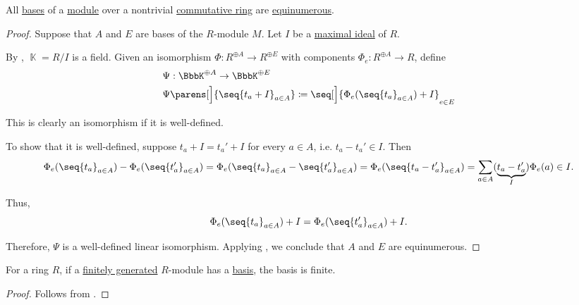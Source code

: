 \begin{proposition}\label{thm:commutative_module_rank}
  All \hyperref[def:hamel_basis]{bases} of a \hyperref[def:module]{module} over a nontrivial \hyperref[def:ring/commutative]{commutative ring} are \hyperref[def:equinumerosity]{equinumerous}.
\end{proposition}
\begin{proof}
  Suppose that \( A \) and \( E \) are bases of the \( R \)-module \( M \). Let \( I \) be a \hyperref[def:semiring_ideal/maximal]{maximal ideal} of \( R \).

  By , \( \BbbK = R / I \) is a field. Given an isomorphism \( \Phi: R^{\oplus A} \to R^{\oplus E} \) with components \( \Phi_e: R^{\oplus A} \to R \), define
  \begin{equation*}
    \begin{aligned}
      &\Psi: \BbbK^{\oplus A} \to \BbbK^{\oplus E} \\
      &\Psi\parens[\Big]{ \seq{ t_a + I }_{a \in A} } \coloneqq \seq[\Big]{ \Phi_e(\seq{ t_a }_{a \in A}) + I }_{e \in E}
    \end{aligned}
  \end{equation*}

  This is clearly an isomorphism if it is well-defined.

  To show that it is well-defined, suppose \( t_a + I = t_a' + I \) for every \( a \in A \), i.e. \( t_a - t_a' \in I \). Then
  \small
  \begin{equation*}
    \Phi_e(\seq{ t_a }_{a \in A}) - \Phi_e(\seq{ t_a' }_{a \in A})
    =
    \Phi_e(\seq{ t_a }_{a \in A} - \seq{ t_a' }_{a \in A})
    =
    \Phi_e(\seq{ t_a - t_a' }_{a \in A})
    =
    \sum_{a \in A} (\underbrace{ t_a - t_a' }_I) \Phi_e(a)
    \in
    I.
  \end{equation*}
  \normalsize

  Thus,
  \begin{equation*}
    \Phi_e(\seq{ t_a }_{a \in A}) + I = \Phi_e(\seq{ t_a' }_{a \in A}) + I.
  \end{equation*}

  Therefore, \( \Psi \) is a well-defined linear isomorphism. Applying , we conclude that \( A \) and \( E \) are equinumerous.
\end{proof}

\begin{corollary}\label{thm:finitely_generated_module_basis}
  For a   ring \( R \), if a \hyperref[def:semimodule/generated]{finitely generated} \( R \)-module has a \hyperref[def:hamel_basis]{basis}, the basis is finite.
\end{corollary}
\begin{proof}
  Follows from .
\end{proof}

